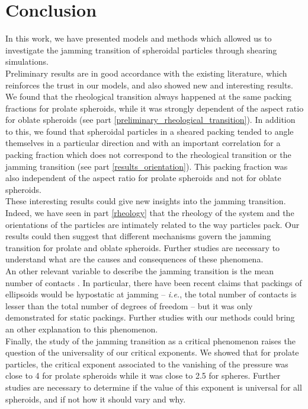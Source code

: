 \documentclass[class=report, float=false, crop=false]{standalone}
\begin{document}
\chapter*{Conclusion}
\label{conclusion}

In this work, we have presented models and methods which allowed us to investigate the jamming transition of spheroidal particles through shearing simulations.\\

Preliminary results are in good accordance with the existing literature, which reinforces the trust in our models, and also showed new and interesting results. We found that the rheological transition always happened at the same packing fractions for prolate spheroids, while it was strongly dependent of the aspect ratio for oblate spheroids (see part \ref{preliminary_rheological_transition}). In addition to this, we found that spheroidal particles in a sheared packing tended to angle themselves in a particular direction and with an important correlation for a packing fraction which does not correspond to the rheological transition or the jamming transition (see part \ref{results_orientation}). This packing fraction was also independent of the aspect ratio for prolate spheroids and not for oblate spheroids.\\

These interesting results could give new insights into the jamming transition. Indeed, we have seen in part \ref{rheology} that the rheology of the system and the orientations of the particles are intimately related to the way particles pack. Our results could then suggest that different mechanisms govern the jamming transition for prolate and oblate spheroids. Further studies are necessary to understand what are the causes and consequences of these phenomena.\\

An other relevant variable to describe the jamming transition is the mean number of contacts \cite{PRE68.011306,PRL88.075507,PRE91.062209,donev2007underconstrained,donev2004improving}. In particular, there have been recent claims that packings of ellipsoids would be hypostatic at jamming -- \textit{i.e.}, the total number of contacts is lesser than the total number of degrees of freedom -- but it was only demonstrated for static packings. Further studies with our methods could bring an other explanation to this phenomenon.\\

Finally, the study of the jamming transition as a critical phenomenon raises the question of the universality of our critical exponents. We showed that for prolate particles, the critical exponent associated to the vanishing of the pressure was close to 4 for prolate spheroids while it was close to 2.5 for spheres. Further studies are necessary to determine if the value of this exponent is universal for all spheroids, and if not how it should vary and why.

% 
\end{document}

